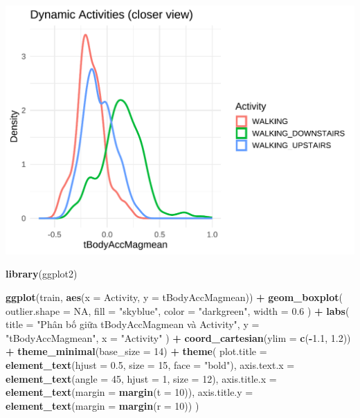 \documentclass[
]{article}
\newenvironment{Shaded}{\begin{snugshade}}{\end{snugshade}}
\newcommand{\AttributeTok}[1]{\textcolor[rgb]{0.13,0.29,0.53}{#1}}
\newcommand{\ConstantTok}[1]{\textcolor[rgb]{0.56,0.35,0.01}{#1}}
\newcommand{\DecValTok}[1]{\textcolor[rgb]{0.00,0.00,0.81}{#1}}
\newcommand{\FloatTok}[1]{\textcolor[rgb]{0.00,0.00,0.81}{#1}}
\newcommand{\FunctionTok}[1]{\textcolor[rgb]{0.13,0.29,0.53}{\textbf{#1}}}
\newcommand{\NormalTok}[1]{#1}
\newcommand{\SpecialCharTok}[1]{\textcolor[rgb]{0.81,0.36,0.00}{\textbf{#1}}}
\newcommand{\StringTok}[1]{\textcolor[rgb]{0.31,0.60,0.02}{#1}}
\begin{document}
\includegraphics{report_files/figure-latex/unnamed-chunk-17-1.pdf}

\begin{Shaded}
\begin{Highlighting}[]
\FunctionTok{library}\NormalTok{(ggplot2)}

\FunctionTok{ggplot}\NormalTok{(train, }\FunctionTok{aes}\NormalTok{(}\AttributeTok{x =}\NormalTok{ Activity, }\AttributeTok{y =}\NormalTok{ tBodyAccMagmean)) }\SpecialCharTok{+}
  \FunctionTok{geom\_boxplot}\NormalTok{(}
    \AttributeTok{outlier.shape =} \ConstantTok{NA}\NormalTok{,}
    \AttributeTok{fill =} \StringTok{"skyblue"}\NormalTok{,}
    \AttributeTok{color =} \StringTok{"darkgreen"}\NormalTok{,}
    \AttributeTok{width =} \FloatTok{0.6}
\NormalTok{  ) }\SpecialCharTok{+}
  \FunctionTok{labs}\NormalTok{(}
    \AttributeTok{title =} \StringTok{"Phân bố giữa tBodyAccMagmean và Activity"}\NormalTok{,}
    \AttributeTok{y =} \StringTok{"tBodyAccMagmean"}\NormalTok{,}
    \AttributeTok{x =} \StringTok{"Activity"}
\NormalTok{  ) }\SpecialCharTok{+}
  \FunctionTok{coord\_cartesian}\NormalTok{(}\AttributeTok{ylim =} \FunctionTok{c}\NormalTok{(}\SpecialCharTok{{-}}\FloatTok{1.1}\NormalTok{, }\FloatTok{1.2}\NormalTok{)) }\SpecialCharTok{+} 
  \FunctionTok{theme\_minimal}\NormalTok{(}\AttributeTok{base\_size =} \DecValTok{14}\NormalTok{) }\SpecialCharTok{+}
  \FunctionTok{theme}\NormalTok{(}
    \AttributeTok{plot.title =} \FunctionTok{element\_text}\NormalTok{(}\AttributeTok{hjust =} \FloatTok{0.5}\NormalTok{, }\AttributeTok{size =} \DecValTok{15}\NormalTok{, }\AttributeTok{face =} \StringTok{"bold"}\NormalTok{),}
    \AttributeTok{axis.text.x =} \FunctionTok{element\_text}\NormalTok{(}\AttributeTok{angle =} \DecValTok{45}\NormalTok{, }\AttributeTok{hjust =} \DecValTok{1}\NormalTok{, }\AttributeTok{size =} \DecValTok{12}\NormalTok{),}
    \AttributeTok{axis.title.x =} \FunctionTok{element\_text}\NormalTok{(}\AttributeTok{margin =} \FunctionTok{margin}\NormalTok{(}\AttributeTok{t =} \DecValTok{10}\NormalTok{)),}
    \AttributeTok{axis.title.y =} \FunctionTok{element\_text}\NormalTok{(}\AttributeTok{margin =} \FunctionTok{margin}\NormalTok{(}\AttributeTok{r =} \DecValTok{10}\NormalTok{))}
\NormalTok{  )}
\end{Highlighting}
\end{Shaded}
\end{document}
